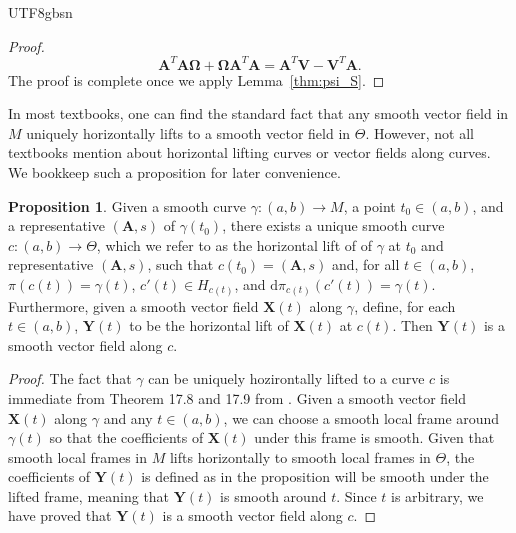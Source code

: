 \documentclass[12pt]{report}
\theoremstyle{plain}
\theoremstyle{definition}
\newtheorem{proposition}[theorem]{Proposition}
\begin{document}
\begin{CJK*}{UTF8}{gbsn}
\begin{proof}
\begin{equation*}
  \bm{A}^T\bm{A}\bm{\Omega} + \bm{\Omega} \bm{A}^T\bm{A} = \bm{A}^T \bm{V} - \bm{V}^T \bm{A}.
\end{equation*}
The proof is complete once we apply
Lemma~\ref{thm:psi_S}.
\end{proof}

In most textbooks, one can find the standard fact that 
any smooth vector field in $M$ uniquely horizontally lifts 
to a smooth vector field in $\Theta$.
However, not all textbooks mention about horizontal lifting curves
or vector fields along curves. We bookkeep such a proposition
for later convenience.

\begin{proposition}\label{thm:curve_lift}
Given a smooth curve $\gamma : (a,b) \to M$, 
a point $t_0 \in (a,b)$, and a representative $(\bm{A},s)$
of $\gamma(t_0)$, there exists a unique smooth curve $c: (a,b) \to \Theta$,
which we refer to as the horizontal lift of of $\gamma$ at $t_0$ and 
representative $(\bm{A},s)$,
such that $c(t_0) = (\bm{A},s)$ and, for all $t \in (a,b)$,
$\pi(c(t)) = \gamma(t)$, $c'(t) \in H_{c(t)}$, and $\mathrm{d} \pi_{c(t)}(c'(t)) = \gamma(t)$.
Furthermore,
given a smooth vector field $\bm{X}(t)$ along $\gamma$,
define, for each $t \in (a,b)$,
$\bm{Y}(t)$
to be the horizontal lift of $\bm{X}(t)$ at $c(t)$.
Then $\bm{Y}(t)$ is a smooth vector field along $c$.
\end{proposition}

\begin{proof}
The fact that $\gamma$ can be uniquely hozirontally lifted to a curve $c$
is immediate from Theorem 17.8 and 17.9 from \citealp{Michor_2008}.
Given a smooth vector field $\bm{X}(t)$ along $\gamma$
and any $t \in (a,b)$, we can choose a smooth local frame 
around $\gamma(t)$ so that the coefficients of $\bm{X}(t)$ 
under this frame is smooth.
Given that smooth local frames in $M$ lifts horizontally 
to smooth local frames in $\Theta$, 
the coefficients of $\bm{Y}(t)$ is defined as in the proposition
will be smooth under the lifted frame, meaning that 
$\bm{Y}(t)$ is smooth around $t$.
Since $t$ is arbitrary, we have proved that $\bm{Y}(t)$
is a smooth vector field along $c$.


\end{proof}
\end{CJK*}
\end{document}
